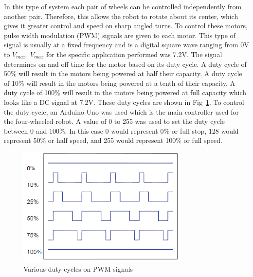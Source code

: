 \documentclass[12pt,american]{report}
\begin{document}
In this type of system each pair of wheels can be controlled independently from another pair.
Therefore, this allows the robot to rotate about its center, which gives it greater control and speed on
sharp angled turns. To control these motors, pulse width modulation (PWM) signals are given to each motor. This type of signal is usually at a fixed frequency and is a digital square wave ranging from 0V to \textit{$V_{max}$}. \textit{$V_{max}$} for the specific application performed was 7.2V. The signal determines on and off time for the motor based on its duty cycle. A duty cycle of 50\% will result in the motors being powered at half their capacity. A duty cycle of 10\% will result in the motors being powered at a tenth of their capacity. A duty cycle of 100\% will result in the motors being powered at full capacity
which looks like a DC signal at 7.2V. These duty cycles are shown in Fig~\ref{fig:pwm}. To control the duty cycle, an Arduino Uno was used which is the main controller used for the four-wheeled robot. A value of 0 to 255 was
used to set the duty cycle between 0 and 100\%. In this case 0 would represent 0\% or full stop, 128 would represent 50\% or half speed, and 255
would represent 100\% or full speed.
\begin{figure}[h!]
\centering
\includegraphics[scale=1]{images/PWM.PNG}
\caption{Various duty cycles on PWM signals}
\label{fig:pwm}
\end{figure}
\end{document}
